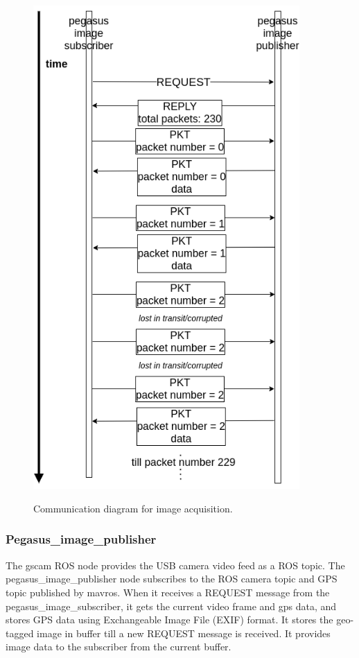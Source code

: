 \begin{figure}
	\centering
	\caption[Communication diagram for image acquisition.]{\small Communication diagram for image acquisition.} 
	\includegraphics[width=4in]{figures/methodology/methodology-image-communication-diagram}
	\label{fig:image-communication-diagram}
\end{figure}


\subsubsection{Pegasus\_image\_publisher}

The gscam ROS node provides the USB camera video feed as a ROS topic. The pegasus\_image\_publisher node subscribes to the ROS camera topic and GPS topic published by mavros. When it receives a REQUEST message from the pegasus\_image\_subscriber, it gets the current video frame and gps data, and stores GPS data using Exchangeable Image File (EXIF) format. It stores the geo-tagged image in buffer till a new REQUEST message is received. It provides image data to the subscriber from the current buffer.


